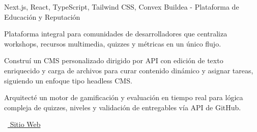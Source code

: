 \begin{cventries}
  \vspace{6mm}
  \cventry
    {Next.js, React, TypeScript, Tailwind CSS, Convex} %
    {Buildea - Plataforma de Educación y Reputación} %
    {} %
    {} %
    {
      \begin{cvitems} %
        \item {Plataforma integral para comunidades de desarrolladores que centraliza workshops, recursos multimedia, quizzes y métricas en un único flujo.}
        \item {Construí un CMS personalizado dirigido por API con edición de texto enriquecido y carga de archivos para curar contenido dinámico y asignar tareas, siguiendo un enfoque tipo headless CMS.}
        \item {Arquitecté un motor de gamificación y evaluación en tiempo real para lógica compleja de quizzes, niveles y validación de entregables vía API de GitHub.}
        \item {\faLink\ \href{https://app.buildea.dev/}{ Sitio Web}}
      \end{cvitems}
    }

\end{cventries}
